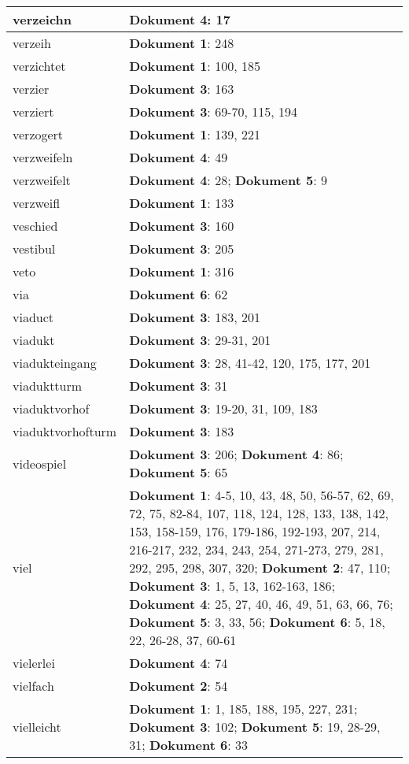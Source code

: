 \documentclass[a5paper]{article}
\begin{document}
\begin{longtable}[l]{|l|p{3in}|}
\hline
verzeichn & \textbf{Dokument 4}: 17 \\
\hline
verzeih & \textbf{Dokument 1}: 248 \\
\hline
verzichtet & \textbf{Dokument 1}: 100, 185 \\
\hline
verzier & \textbf{Dokument 3}: 163 \\
\hline
verziert & \textbf{Dokument 3}: 69-70, 115, 194 \\
\hline
verzogert & \textbf{Dokument 1}: 139, 221 \\
\hline
verzweifeln & \textbf{Dokument 4}: 49 \\
\hline
verzweifelt & \textbf{Dokument 4}: 28; \textbf{Dokument 5}: 9 \\
\hline
verzweifl & \textbf{Dokument 1}: 133 \\
\hline
veschied & \textbf{Dokument 3}: 160 \\
\hline
vestibul & \textbf{Dokument 3}: 205 \\
\hline
veto & \textbf{Dokument 1}: 316 \\
\hline
via & \textbf{Dokument 6}: 62 \\
\hline
viaduct & \textbf{Dokument 3}: 183, 201 \\
\hline
viadukt & \textbf{Dokument 3}: 29-31, 201 \\
\hline
viadukteingang & \textbf{Dokument 3}: 28, 41-42, 120, 175, 177, 201 \\
\hline
viaduktturm & \textbf{Dokument 3}: 31 \\
\hline
viaduktvorhof & \textbf{Dokument 3}: 19-20, 31, 109, 183 \\
\hline
viaduktvorhofturm & \textbf{Dokument 3}: 183 \\
\hline
videospiel & \textbf{Dokument 3}: 206; \textbf{Dokument 4}: 86; \textbf{Dokument 5}: 65 \\
\hline
viel & \textbf{Dokument 1}: 4-5, 10, 43, 48, 50, 56-57, 62, 69, 72, 75, 82-84, 107, 118, 124, 128, 133, 138, 142, 153, 158-159, 176, 179-186, 192-193, 207, 214, 216-217, 232, 234, 243, 254, 271-273, 279, 281, 292, 295, 298, 307, 320; \textbf{Dokument 2}: 47, 110; \textbf{Dokument 3}: 1, 5, 13, 162-163, 186; \textbf{Dokument 4}: 25, 27, 40, 46, 49, 51, 63, 66, 76; \textbf{Dokument 5}: 3, 33, 56; \textbf{Dokument 6}: 5, 18, 22, 26-28, 37, 60-61 \\
\hline
vielerlei & \textbf{Dokument 4}: 74 \\
\hline
vielfach & \textbf{Dokument 2}: 54 \\
\hline
vielleicht & \textbf{Dokument 1}: 1, 185, 188, 195, 227, 231; \textbf{Dokument 3}: 102; \textbf{Dokument 5}: 19, 28-29, 31; \textbf{Dokument 6}: 33 \\

\end{longtable}
\end{document}
